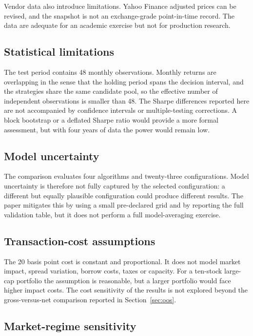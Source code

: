 \documentclass[11pt,a4paper]{article}
\begin{document}
Vendor data also introduce limitations. Yahoo Finance adjusted prices can be revised, and the snapshot is not an exchange-grade point-in-time record. The data are adequate for an academic exercise but not for production research.

\subsection{Statistical limitations}

The test period contains 48 monthly observations. Monthly returns are overlapping in the sense that the holding period spans the decision interval, and the strategies share the same candidate pool, so the effective number of independent observations is smaller than 48. The Sharpe differences reported here are not accompanied by confidence intervals or multiple-testing corrections. A block bootstrap or a deflated Sharpe ratio \citep{bailey2014} would provide a more formal assessment, but with four years of data the power would remain low.

\subsection{Model uncertainty}

The comparison evaluates four algorithms and twenty-three configurations. Model uncertainty is therefore not fully captured by the selected configuration: a different but equally plausible configuration could produce different results. The paper mitigates this by using a small pre-declared grid and by reporting the full validation table, but it does not perform a full model-averaging exercise.

\subsection{Transaction-cost assumptions}

The 20 basis point cost is constant and proportional. It does not model market impact, spread variation, borrow costs, taxes or capacity. For a ten-stock large-cap portfolio the assumption is reasonable, but a larger portfolio would face higher impact costs. The cost sensitivity of the results is not explored beyond the gross-versus-net comparison reported in Section~\ref{sec:oos}.

\subsection{Market-regime sensitivity}
\end{document}
